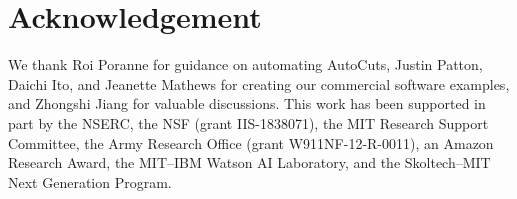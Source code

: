 
\section*{Acknowledgement}
We thank Roi Poranne for guidance on automating AutoCuts, Justin Patton, Daichi Ito, and Jeanette Mathews for creating our commercial software examples, and Zhongshi Jiang for valuable discussions.
This work has been supported in part by the NSERC, the NSF (grant IIS-1838071), the MIT Research Support Committee, the Army Research Office (grant W911NF-12-R-0011), an Amazon Research Award, the MIT--IBM Watson AI Laboratory, and the Skoltech--MIT Next Generation Program.

